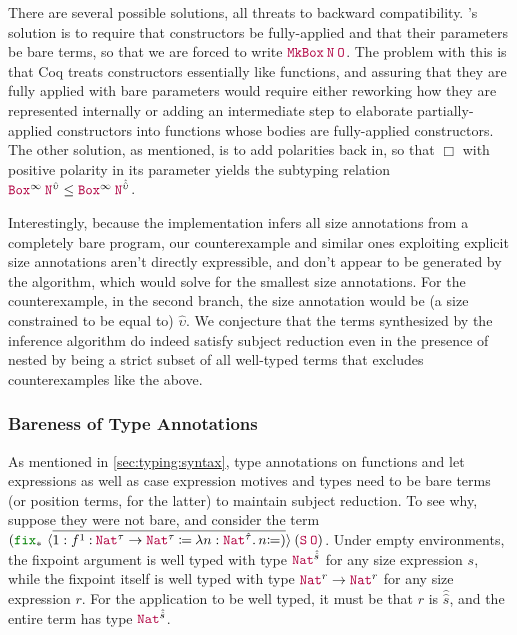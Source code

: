 There are several possible solutions, all threats to backward compatibility.
\CIChat's solution is to require that constructors be fully-applied and that their parameters be bare terms,
so that we are forced to write $\app{\MkBox}{\nat}{\Zero}$.
The problem with this is that Coq treats constructors essentially like functions,
and assuring that they are fully applied with bare parameters would require either reworking how they are represented internally
or adding an intermediate step to elaborate partially-applied constructors into functions whose bodies are fully-applied constructors.
The other solution, as mentioned, is to add polarities back in, so that $\Box$ with positive polarity in its parameter yields the subtyping relation $\app{\Box^\infty}{\nat^{\hat{\upsilon}}} \leq \app{\Box^\infty}{\nat^{\hat{\hat{\upsilon}}}}$.

Interestingly, because the implementation infers all size annotations from a completely bare program,
our counterexample and similar ones exploiting explicit size annotations aren't directly expressible,
and don't appear to be generated by the algorithm, which would solve for the smallest size annotations.
For the counterexample, in the second branch, the size annotation would be (a size constrained to be equal to) $\hat{\upsilon}$.
We conjecture that the terms synthesized by the inference algorithm do indeed satisfy subject reduction even in the presence of nested \coinductives
by being a strict subset of all well-typed terms that excludes counterexamples like the above.

\subsubsection{Bareness of Type Annotations}\label{sec:metatheory:sr:bare}

As mentioned in \autoref{sec:typing:syntax}, type annotations on functions and let expressions
as well as case expression motives and \cofixpoint types
need to be bare terms (or position terms, for the latter) to maintain subject reduction.
To see why, suppose they were not bare, and consider the term
$\app{(\fix*{1}{\defn{f^1}{\Nat^\tau \rightarrow \Nat^\tau}{\abs{n}{\Nat^{\hat{\tau}}}{n}}})}{(\app{\Succ}{\Zero})}$.
Under empty environments, the fixpoint argument is well typed with type $\Nat^{\hat{\hat{s}}}$ for any size expression $s$,
while the fixpoint itself is well typed with type $\Nat^{r} \rightarrow \Nat^{r}$ for any size expression $r$.
For the application to be well typed, it must be that $r$ is $\hat{\hat{s}}$,
and the entire term has type $\Nat^{\hat{\hat{s}}}$.


